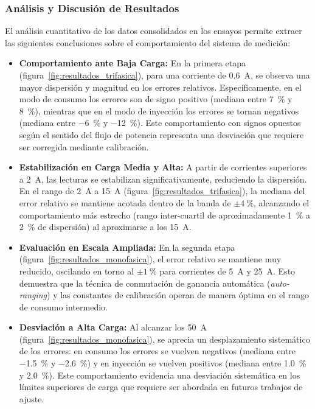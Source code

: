 \documentclass[12pt, a4paper]{article} %
\begin{document}
\subsubsection{Análisis y Discusión de Resultados}

El análisis cuantitativo de los datos consolidados en los ensayos permite extraer las siguientes conclusiones sobre el comportamiento del sistema de medición:

\begin{itemize}
  \item \textbf{Comportamiento ante Baja Carga:} En la primera etapa (figura~\ref{fig:resultados_trifasica}), para una corriente de \qty{0.6}{\ampere}, se observa una mayor dispersión y magnitud en los errores relativos. Específicamente, en el modo de consumo los errores son de signo positivo (mediana entre \qty{7}{\percent} y \qty{8}{\percent}), mientras que en el modo de inyección los errores se tornan negativos (mediana entre \qty{-6}{\percent} y \qty{-12}{\percent}). Este comportamiento con signos opuestos según el sentido del flujo de potencia representa una desviación que requiere ser corregida mediante calibración.
  \item \textbf{Estabilización en Carga Media y Alta:} A partir de corrientes superiores a \qty{2}{\ampere}, las lecturas se estabilizan significativamente, reduciendo la dispersión. En el rango de \qty{2}{\ampere} a \qty{15}{\ampere} (figura~\ref{fig:resultados_trifasica}), la mediana del error relativo se mantiene acotada dentro de la banda de $\pm\qty{4}{\percent}$, alcanzando el comportamiento más estrecho (rango inter-cuartil de aproximadamente \qty{1}{\percent} a \qty{2}{\percent} de dispersión) al aproximarse a los \qty{15}{\ampere}.
  \item \textbf{Evaluación en Escala Ampliada:} En la segunda etapa (figura~\ref{fig:resultados_monofasica}), el error relativo se mantiene muy reducido, oscilando en torno al $\pm\qty{1}{\percent}$ para corrientes de \qty{5}{\ampere} y \qty{25}{\ampere}. Esto demuestra que la técnica de conmutación de ganancia automática (\textit{auto-ranging}) y las constantes de calibración operan de manera óptima en el rango de consumo intermedio.
  \item \textbf{Desviación a Alta Carga:} Al alcanzar los \qty{50}{\ampere} (figura~\ref{fig:resultados_monofasica}), se aprecia un desplazamiento sistemático de los errores: en consumo los errores se vuelven negativos (mediana entre \qty{-1.5}{\percent} y \qty{-2.6}{\percent}) y en inyección se vuelven positivos (mediana entre \qty{1.0}{\percent} y \qty{2.0}{\percent}). Este comportamiento evidencia una desviación sistemática en los límites superiores de carga que requiere ser abordada en futuros trabajos de ajuste.

\end{itemize}
\end{document}
